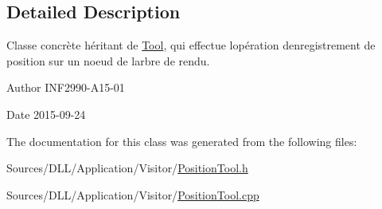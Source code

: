 \subsection{Detailed Description}
Classe concrète héritant de \hyperlink{class_tool}{Tool}, qui effectue l\textquotesingle{}opération d\textquotesingle{}enregistrement de position sur un noeud de l\textquotesingle{}arbre de rendu. 

\begin{DoxyAuthor}{Author}
I\+N\+F2990-\/\+A15-\/01 
\end{DoxyAuthor}
\begin{DoxyDate}{Date}
2015-\/09-\/24 
\end{DoxyDate}


The documentation for this class was generated from the following files\+:\begin{DoxyCompactItemize}
\item 
Sources/\+D\+L\+L/\+Application/\+Visitor/\hyperlink{_position_tool_8h}{Position\+Tool.\+h}\item 
Sources/\+D\+L\+L/\+Application/\+Visitor/\hyperlink{_position_tool_8cpp}{Position\+Tool.\+cpp}\end{DoxyCompactItemize}
